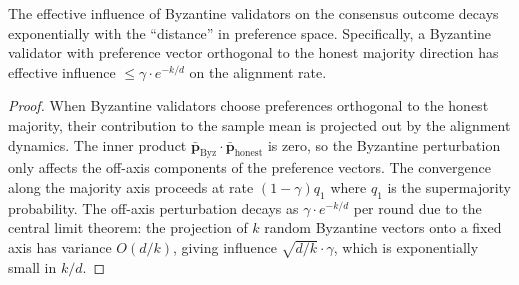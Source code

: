 \begin{lemma}
\label{lem:screening}
The effective influence of Byzantine validators on the consensus outcome decays
exponentially with the ``distance'' in preference space. Specifically, a Byzantine
validator with preference vector orthogonal to the honest majority direction has
effective influence $\leq \gamma \cdot e^{-k/d}$ on the alignment rate.
\end{lemma}

\begin{proof}
When Byzantine validators choose preferences orthogonal to the honest majority, their
contribution to the sample mean is projected out by the alignment dynamics. The inner
product $\bar{\mathbf{p}}_{\text{Byz}} \cdot \bar{\mathbf{p}}_{\text{honest}}$ is zero,
so the Byzantine perturbation only affects the off-axis components of the preference
vectors. The convergence along the majority axis proceeds at rate $(1 - \gamma)q_1$
where $q_1$ is the supermajority probability. The off-axis perturbation decays as
$\gamma \cdot e^{-k/d}$ per round due to the central limit theorem: the projection of
$k$ random Byzantine vectors onto a fixed axis has variance $O(d/k)$, giving influence
$\sqrt{d/k} \cdot \gamma$, which is exponentially small in $k/d$.
\end{proof}

